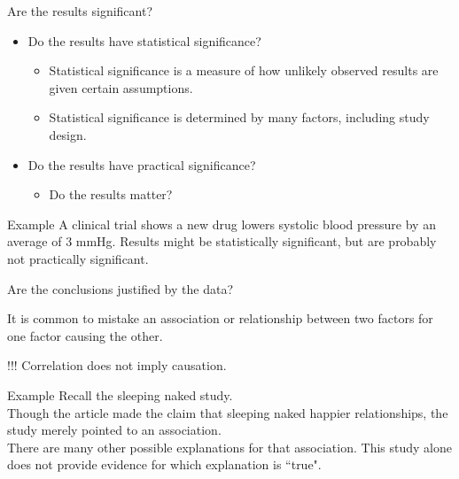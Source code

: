 \documentclass[xcolor=table, aspectratio=169, bigger]{beamer}
\begin{document}
\begin{frame}{Are the results significant?}
\begin{block}{}
\begin{itemize}
\item Do the results have statistical significance?
\begin{itemize}
\item Statistical significance is a measure of how unlikely observed results are given certain assumptions.
\item Statistical significance is determined by many factors, including study design.
\end{itemize}
\pause\item Do the results have practical significance?
\begin{itemize}
\item Do the results matter?
\end{itemize}
\end{itemize}
\end{block}

\pause
\begin{exampleblock}{Example}
A clinical trial shows a new drug lowers systolic blood pressure by an average of 3 mmHg. Results might be statistically significant, but are probably not practically significant.
\end{exampleblock}
\end{frame}

\begin{frame}{Are the conclusions justified by the data?}

\begin{block}{}
It is common to mistake an association or relationship between two factors for one factor causing the other.
\end{block}

\pause

\begin{alertblock}{!!!}
\Large Correlation does not imply causation.
\end{alertblock}

\pause
\begin{exampleblock}{Example}
Recall the sleeping naked study.\\
\medskip
Though the article made the claim that sleeping naked  happier relationships, the study merely pointed to an association.\\
\medskip
There are many other possible explanations for that association. This study alone does not provide evidence for which explanation is ``true".

\end{exampleblock}

\end{frame}
\end{document}
